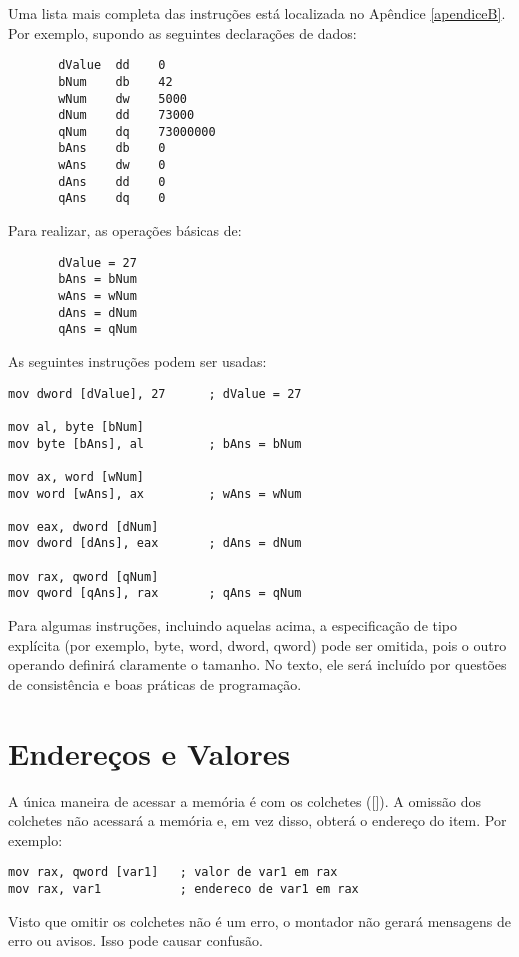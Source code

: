 Uma lista mais completa das instruções está localizada no Apêndice \ref{apendiceB}.\\

Por exemplo, supondo as seguintes declarações de dados:
\begin{verbatim}
       dValue  dd    0
       bNum    db    42
       wNum    dw    5000
       dNum    dd    73000
       qNum    dq    73000000
       bAns    db    0
       wAns    dw    0
       dAns    dd    0
       qAns    dq    0
\end{verbatim}

Para realizar, as operações básicas de:
\begin{verbatim}
       dValue = 27
       bAns = bNum
       wAns = wNum
       dAns = dNum
       qAns = qNum
\end{verbatim}

As seguintes instruções podem ser usadas:
\begin{lstlisting}
mov dword [dValue], 27		; dValue = 27

mov al, byte [bNum]
mov byte [bAns], al 		; bAns = bNum

mov ax, word [wNum]
mov word [wAns], ax 		; wAns = wNum

mov eax, dword [dNum]
mov dword [dAns], eax 		; dAns = dNum

mov rax, qword [qNum]
mov qword [qAns], rax 		; qAns = qNum
\end{lstlisting}


Para algumas instruções, incluindo aquelas acima, a especificação de tipo explícita (por exemplo, byte, word, dword, qword) pode ser omitida, pois o outro operando definirá claramente o tamanho. No texto, ele será incluído por questões de consistência e boas práticas de programação.

\section{Endereços e Valores}
A única maneira de acessar a memória é com os colchetes ([]). A omissão dos colchetes não acessará a memória e, em vez disso, obterá o endereço do item. Por exemplo:
\begin{lstlisting}
mov rax, qword [var1]	; valor de var1 em rax
mov rax, var1           ; endereco de var1 em rax
\end{lstlisting}

Visto que omitir os colchetes não é um erro, o montador não gerará mensagens de erro ou avisos. Isso pode causar confusão.

